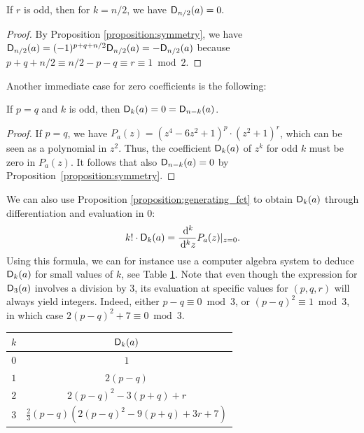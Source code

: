 \documentclass[11pt]{llncs}
\begin{document}
\begin{Corollary}
	If $r$ is odd, then for $k=n/2$, we have $\Dnka n{n/2}a=0.$
\end{Corollary}

\begin{proof}
	By Proposition \ref{proposition:symmetry}, we have $\Dnka n{n/2}a=(-1)^{p+q+n/2}\Dnka n{n/2}a=-\Dnka n{n/2}a$ because $p+q+n/2\equiv n/2-p-q\equiv r\equiv 1\bmod 2$.
\end{proof}

Another immediate case for zero coefficients is the following:


\begin{proposition}
    If $p=q$ and $k$ is odd, then $\Dnka nka=0=\Dnka n{n-k}a$.
\end{proposition}

\begin{proof}
    If $p=q$, we have $P_a(z)=(z^4-6z^2+1)^p\cdot(z^2+1)^r$, which can be seen as a polynomial in $z^2$. Thus, the coefficient $\Dnka nka$ of $z^k$ for odd $k$ must be zero in $P_a(z)$. It follows that also $\Dnka n{n-k}a=0$ by Proposition~\ref{proposition:symmetry}.
\end{proof}





\begin{remark}\label{remark:D_nka_differentiation}
    We can also use Proposition \ref{proposition:generating_fct} to obtain $\Dnka nka$ through differentiation and evaluation in $0$:
    \[
        k!\cdot\Dnka nka=\frac{\dd^k}{\dd^k z}P_a(z)\vert_{z=0}.
    \]
    Using this formula, we can for instance use a computer algebra system to deduce $\Dnka nka$ for small values of $k$, see Table \ref{tab:Dnka_small_k}. Note that even though the expression for $\Dnka n3a$ involves a division by $3$, its evaluation at specific values for $(p,q,r)$ will always yield integers. Indeed, either $p-q\equiv 0\bmod 3$, or $(p-q)^2\equiv 1\bmod 3$, in which case $2(p-q)^2+7\equiv 0\bmod 3$.
    
    \begin{table}
    	\centering
    	\begin{tabular}{|c|c|}
    		\hline
    		$k$ & $\Dnka nka$\\ \hline
    		$0$&$1$\\ \hline
            $1$&$2(p-q)$\\ \hline
            $2$&$2(p-q)^2-3(p+q)+r$\\ \hline
            $3$&$\frac 23(p-q)\left(2(p-q)^2-9(p+q)+3r+7\right)$\\ \hline
    	\end{tabular}
    	\label{tab:Dnka_small_k}
    \end{table}
\end{remark}
\end{document}
